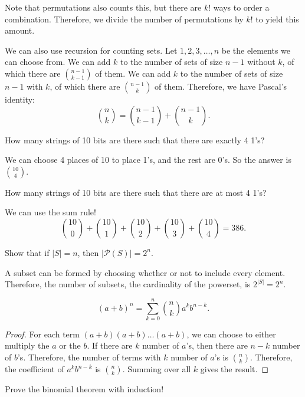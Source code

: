 \documentclass[a4paper]{article}
\begin{document}
Note that permutations also counts this, but there are \( k! \) ways to order a combination. Therefore, we divide the number of permutations by \( k! \) to yield this amount.

We can also use recursion for counting sets. Let \( 1,2,3,\ldots ,n \) be the elements we can choose from. We can add \( k \) to the number of sets of size \( n-1 \) without \( k \), of which there are \( \binom{n-1}{k-1} \) of them. We can add \( k \) to the number of sets of size \( n-1  \) with \( k \), of which there are \( \binom{n-1}{k} \) of them. Therefore, we have Pascal's identity: \[
	\binom{n}{k}=\binom{n-1}{k-1}+\binom{n-1}{k}
.\]


\begin{eg}
	How many strings of 10 bits are there such that there are exactly 4 1's?
\end{eg}

We can choose 4 places of 10 to place 1's, and the rest are 0's. So the answer is $\binom{10}{4}$. 

\begin{eg}
	How many strings of 10 bits are there such that there are at most 4 1's?
\end{eg}

We can use the sum rule! \[
	\binom{10}{0} + \binom{10}{1} + \binom{10}{2} + \binom{10}{3} + \binom{10}{4} = 386
.\] 

\begin{eg}
	Show that if \( |S| = n \), then \( |\mathcal{P}(S)| = 2^n \).
\end{eg}

A subset can be formed by choosing whether or not to include every element. Therefore, the number of subsets, the cardinality of the powerset, is \( 2^{|S|} = 2^n \).

\begin{theorem}
	\[
		(a+b)^n = \sum_{k=0}^n \binom{n}{k} a^k b^{n-k}
	.\] 
\end{theorem}

\begin{proof}
	For each term \( (a+b)(a+b)\ldots (a+b) \), we can choose to either multiply the \( a \) or the \( b \). If there are \( k \) number of \( a \)'s, then there are \( n-k \) number of \( b \)'s. Therefore, the number of terms with \( k \) number of \( a \)'s is \( \binom{n}{k} \). Therefore, the coefficient of \( a^k b^{n-k} \) is \( \binom{n}{k} \). Summing over all \( k \) gives the result.
\end{proof}

Prove the binomial theorem with induction!
\end{document}
